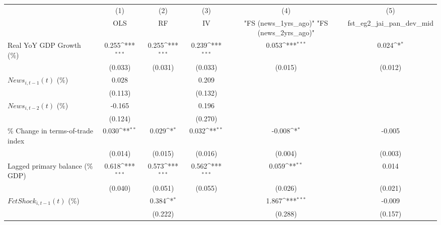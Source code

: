 {
\def\sym#1{\ifmmode^{#1}\else\(^{#1}\)\fi}
\begin{tabular}{l*{5}{c}}
\toprule
                    &\multicolumn{1}{c}{(1)}&\multicolumn{1}{c}{(2)}&\multicolumn{1}{c}{(3)}&\multicolumn{1}{c}{(4)}&\multicolumn{1}{c}{(5)}\\
                    &\multicolumn{1}{c}{OLS}&\multicolumn{1}{c}{RF}&\multicolumn{1}{c}{IV}&\multicolumn{1}{c}{ "FS (news_1yrs_ago)"  "FS (news_2yrs_ago)" }&\multicolumn{1}{c}{fst_eg2_jai_pan_dev_mid}\\
\midrule
Real YoY GDP Growth (\%)&       0.255\sym{***}&       0.255\sym{***}&       0.239\sym{***}&       0.053\sym{***}&       0.024\sym{*}  \\
                    &     (0.033)         &     (0.031)         &     (0.033)         &     (0.015)         &     (0.012)         \\
\addlinespace
$ News_{i,t-1}(t)$ (\%)&       0.028         &                     &       0.209         &                     &                     \\
                    &     (0.113)         &                     &     (0.132)         &                     &                     \\
\addlinespace
$ News_{i,t-2}(t)$ (\%)&      -0.165         &                     &       0.196         &                     &                     \\
                    &     (0.124)         &                     &     (0.270)         &                     &                     \\
\addlinespace
\% Change in terms-of-trade index&       0.030\sym{**} &       0.029\sym{*}  &       0.032\sym{**} &      -0.008\sym{*}  &      -0.005         \\
                    &     (0.014)         &     (0.015)         &     (0.016)         &     (0.004)         &     (0.003)         \\
\addlinespace
Lagged primary balance (\% GDP)&       0.618\sym{***}&       0.573\sym{***}&       0.562\sym{***}&       0.059\sym{**} &       0.014         \\
                    &     (0.040)         &     (0.051)         &     (0.055)         &     (0.026)         &     (0.021)         \\
\addlinespace
$ FctShock_{i,t-1}(t)$ (\%)&                     &       0.384\sym{*}  &                     &       1.867\sym{***}&      -0.009         \\
                    &                     &     (0.222)         &                     &     (0.288)         &     (0.157)         \\

\end{tabular}}
